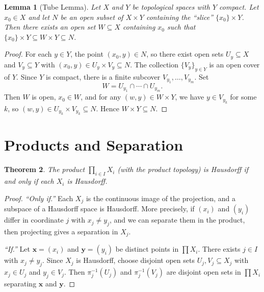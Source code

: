 \documentclass[11pt,a4paper,twoside]{book}
\newtheorem{theorem}{Theorem}[section]
\newtheorem{lemma}[theorem]{Lemma}
\theoremstyle{remark}
\theoremstyle{definition}
\theoremstyle{definition}
\begin{document}
\begin{lemma}[Tube Lemma]\label{lem:tube}
Let $X$ and $Y$ be topological spaces with $Y$ compact.  Let
$x_0\in X$ and let $N$ be an open subset of $X\times Y$ containing
the ``slice'' $\{x_0\}\times Y$.  Then there exists an open set
$W\subseteq X$ containing $x_0$ such that $\{x_0\}\times Y
\subseteq W\times Y\subseteq N$.
\end{lemma}

\begin{proof}
For each $y\in Y$, the point $(x_0,y)\in N$, so there exist open
sets $U_y\subseteq X$ and $V_y\subseteq Y$ with
$(x_0,y)\in U_y\times V_y\subseteq N$.  The collection
$\{V_y\}_{y\in Y}$ is an open cover of $Y$.  Since $Y$ is compact,
there is a finite subcover $V_{y_1},\dots,V_{y_m}$.  Set
\[
   W = U_{y_1}\cap\cdots\cap U_{y_m}.
\]
Then $W$ is open, $x_0\in W$, and for any $(w,y)\in W\times Y$,
we have $y\in V_{y_k}$ for some $k$, so
$(w,y)\in U_{y_k}\times V_{y_k}\subseteq N$.  Hence
$W\times Y\subseteq N$.
\end{proof}

\section{Products and Separation}
\label{sec:product-separation}

\begin{theorem}\label{thm:product-hausdorff}
The product $\prod_{i\in I}X_i$ (with the product topology) is
Hausdorff if and only if each $X_i$ is Hausdorff.
\end{theorem}

\begin{proof}
\emph{``Only if.''}\; Each $X_j$ is the continuous image of the
projection, and a subspace of a Hausdorff space is Hausdorff.
More precisely, if $(x_i)$ and $(y_i)$ differ in coordinate $j$
with $x_j\neq y_j$, and we can separate them in the product, then
projecting gives a separation in $X_j$.

\emph{``If.''}\; Let $\mathbf{x}=(x_i)$ and $\mathbf{y}=(y_i)$
be distinct points in $\prod X_i$.  There exists $j\in I$ with
$x_j\neq y_j$.  Since $X_j$ is Hausdorff, choose disjoint open
sets $U_j,V_j\subseteq X_j$ with $x_j\in U_j$ and $y_j\in V_j$.
Then $\pi_j^{-1}(U_j)$ and $\pi_j^{-1}(V_j)$ are disjoint open
sets in $\prod X_i$ separating $\mathbf{x}$ and $\mathbf{y}$.
\end{proof}
\end{document}
